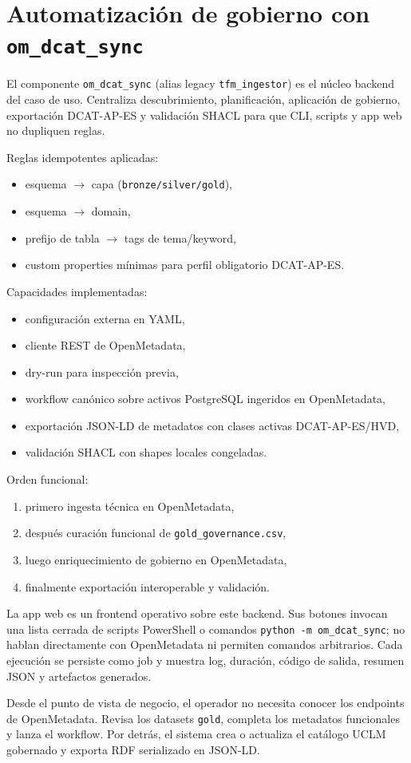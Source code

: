 \section{Automatización de gobierno con \texttt{om\_dcat\_sync}}

El componente \texttt{om\_dcat\_sync} (alias legacy \texttt{tfm\_ingestor}) es el núcleo backend del caso de uso. Centraliza descubrimiento, planificación, aplicación de gobierno, exportación DCAT-AP-ES y validación SHACL para que CLI, scripts y app web no dupliquen reglas.

Reglas idempotentes aplicadas:
\begin{itemize}
  \item esquema $\rightarrow$ capa (\texttt{bronze/silver/gold}),
  \item esquema $\rightarrow$ domain,
  \item prefijo de tabla $\rightarrow$ tags de tema/keyword,
  \item custom properties mínimas para perfil obligatorio DCAT-AP-ES.
\end{itemize}

Capacidades implementadas:
\begin{itemize}
  \item configuración externa en YAML,
  \item cliente REST de OpenMetadata,
  \item dry-run para inspección previa,
  \item workflow canónico sobre activos PostgreSQL ingeridos en OpenMetadata,
  \item exportación JSON-LD de metadatos con clases activas DCAT-AP-ES/HVD,
  \item validación SHACL con shapes locales congeladas.
\end{itemize}

Orden funcional:
\begin{enumerate}
  \item primero ingesta técnica en OpenMetadata,
  \item después curación funcional de \texttt{gold\_governance.csv},
  \item luego enriquecimiento de gobierno en OpenMetadata,
  \item finalmente exportación interoperable y validación.
\end{enumerate}

La app web es un frontend operativo sobre este backend. Sus botones invocan una lista cerrada de scripts PowerShell o comandos \texttt{python -m om\_dcat\_sync}; no hablan directamente con OpenMetadata ni permiten comandos arbitrarios. Cada ejecución se persiste como job y muestra log, duración, código de salida, resumen JSON y artefactos generados.

Desde el punto de vista de negocio, el operador no necesita conocer los endpoints de OpenMetadata. Revisa los datasets \texttt{gold}, completa los metadatos funcionales y lanza el workflow. Por detrás, el sistema crea o actualiza el catálogo UCLM gobernado y exporta RDF serializado en JSON-LD.
